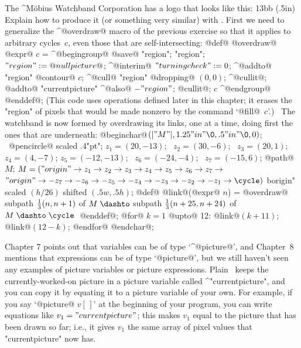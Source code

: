 {{{{\restorehsize
\ddangerexercise The ^{M\"obius} Watchband Corporation has a logo that
looks like this:
\displayfig 13bb (.5in)
Explain how to produce it (or something very similar) with \MF\!.
\answer First we need to generalize the ^@overdraw@ macro of the previous
exercise so that it applies to arbitrary cycles~$c$, even those that are
self-intersecting:
\begindisplay
@def@ @overdraw@ @expr@ $c$ = ^@begingroup@ @save@ "region";\cr
\indent@picture@ "region"; $"region":=@nullpicture@$;\cr
\indent^@interim@ $"turningcheck":=0$; ^@addto@ "region" @contour@ $c$;\cr
\indent^@cull@ "region" @dropping@ $(0,0)$;\cr
\indent^@cullit@; @addto@ "currentpicture" ^@also@ $-"region"$; @cullit@;\cr
\indent@draw@ $c$ ^@endgroup@ @enddef@;\cr
\enddisplay
(This code uses operations defined later in this chapter; it erases the
"region" of pixels that would be made nonzero by the command `@fill@~$c$'.)
\ The watchband is now formed by overdrawing its links, one at a time,
doing first the ones that are underneath:
\begindisplay
@beginchar@$(|"M"|,1.25"in"\0,.5"in"\0,0)$; \
 \pickup @pencircle@ scaled .4"pt";\cr
$z_1=(20,-13)$; \ $z_2=(30,-6)$; \ $z_3=(20,1)$; \ $z_4=(4,-7)$;\cr
\indent $z_5=(-12,-13)$; \ $z_6=(-24,-4)$; \ $z_7=(-15,6)$;\cr
@path@ $M$; $M=("origin"\to z_1\to z_2\to z_3\to z_4\to z_5\to z_6\to z_7\to$\cr
\indent$"origin"\to -z_7\to -z_6\to -z_5\to -z_4\to -z_3\to -z_2\to -z_1\to\cycle)$\cr
^^"origin" \indent\indent scaled $(h/26)$ shifted $(.5w,.5h)$;\cr
@def@ @link@(@expr@ $n$) =\cr
\indent @overdraw@ subpath ${1\over3}(n,n+1)$ of $M\;\dashto$\cr
\indent\indent  subpath ${1\over3}(n+25,n+24)$ of $M\;\dashto\;\cycle\;$
 @enddef@;\cr
@for@ $k=1$ @upto@ 12: @link@$(k+11)$; @link@$(12-k)$; @endfor@
@endchar@;\cr
\enddisplay

\danger Chapter 7 points out that variables can be of type `^@picture@',
and Chapter~8 mentions that expressions can be of type `@picture@', but
we still haven't seen any examples of picture variables or picture
expressions. Plain \MF\ keeps the currently-worked-on picture in a
picture variable called ^"currentpicture", and you can copy it by
equating it to a picture variable of your own. For example, if you
say `@picture@ $v[\,]$' at the beginning of your program, you can write
equations like
\begindisplay
$v_1="currentpicture"$;
\enddisplay
this makes $v_1$ equal to the picture that has been drawn so far; i.e.,
it gives $v_1$ the same array of pixel values that "currentpicture" now has.

}}}}
